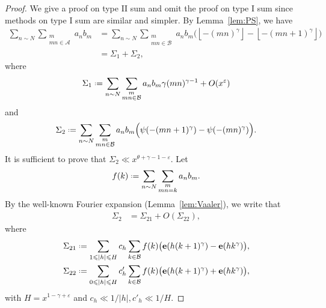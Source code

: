 \documentclass[12pt, reqno, twoside, letterpaper]{amsart}
\numberwithin{equation}{section}
\def\fl#1{\left\lfloor#1\right\rfloor}
\newcommand{\e}{\ensuremath{\mathbf{e}}}
\newcommand{\cA}{\ensuremath{\mathcal{A}}}
\newcommand{\cB}{\ensuremath{\mathcal{B}}}
\theoremstyle{customthm}
\theoremstyle{customrem}
\def\fl#1{\left\lfloor#1\right\rfloor}
\newcommand*{\defeq}{\mathrel{\vcenter{\baselineskip0.5ex \lineskiplimit0pt
			\hbox{\scriptsize.}\hbox{\scriptsize.}}}%
	=}
\begin{document}
\begin{proof}
We give a proof on type II sum and omit the proof on type I sum since methods on type I sum are similar and simpler. By Lemma~\ref{lem:PS}, we have
\begin{align*}
\sum_{n \sim N} \sum_{\substack{m \\ mn \in \cA}} a_n b_m &= \sum_{n \sim N} \sum_{\substack{m \\ mn \in \cB}} a_n b_m  \Big( \fl{-(mn)^{\gamma}} - \fl{-(mn+1)^{\gamma}} \Big) \\
&= \Sigma_1 + \Sigma_2,
\end{align*}
where 
\begin{align*}
\Sigma_1 \defeq \sum_{n \sim N} \sum_{\substack{m \\ mn \in \cB}} a_n b_m \gamma (mn)^{\gamma-1} + O(x^{\varepsilon})
\end{align*}
and
\begin{align*}
\Sigma_2 \defeq \sum_{n \sim N} \sum_{\substack{m \\ mn \in \cB}} a_n b_m \Big( \psi(-(mn+1)^{\gamma}) - \psi(-(mn)^{\gamma}) \Big). 
\end{align*}
It is sufficient to prove that $\Sigma_2 \ll x^{\theta + \gamma - 1 - \varepsilon}$. Let
$$
f(k) \defeq  \sum_{n \sim N} \sum_{\substack{m \\ mn = k }} a_n b_m.
$$
By the well-known Fourier expansion (Lemma~\ref{lem:Vaaler}), we write that
\begin{align*}
\Sigma_2 &= \Sigma_{21} + O(\Sigma_{22}),
\end{align*}
where 
\begin{align*}
\Sigma_{21} &\defeq \sum_{1 \leqslant |h| \leqslant H} c_h \sum_{\substack{k \in \cB}} f(k)\big( \e(h(k+1)^{\gamma}) - \e(hk^{\gamma}) \big), \\
\Sigma_{22} &\defeq \sum_{0 \leqslant |h| \leqslant H} c'_h \sum_{\substack{k \in \cB}} f(k)\big( \e(h(k+1)^{\gamma}) + \e(hk^{\gamma}) \big),  
\end{align*}
with $H = x^{1 - \gamma +\varepsilon}$ and $c_h \ll 1/|h|, c'_h \ll 1/H$. 


\end{proof}
\end{document}
